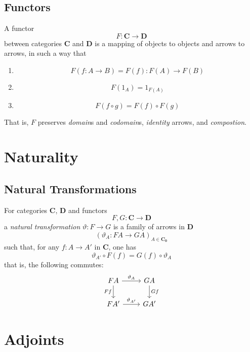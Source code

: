 \documentclass{article}
\begin{document}
\subsection{Functors}
\begin{defn}[{\cite{AS10}}]
A functor
\[
F: \mathbf{C} \rightarrow \mathbf{D}
\]
between categories $\mathbf{C}$ and $\mathbf{D}$ is a mapping of objects to objects and arrows to arrows,
in such a way that
\begin{enumerate}
\item
\[
F(f:A \rightarrow B) = F(f):F(A) \rightarrow F(B)
\]
\item
\[
F(1_{A}) = 1_{F(A)}
\]
\item
\[
F(f \circ g) = F(f) \circ F(g)
\]
\end{enumerate}
That is, $F$ preserves \emph{domain}s and \emph{codomain}s, \emph{identity} arrows, and \emph{compostion}.
\end{defn}

\section{Naturality}
\subsection{Natural Transformations}
\begin{defn}[{\cite{AS10}}]
For categories $\mathbf{C}$, $\mathbf{D}$ and functors
\[
F,G: \mathbf{C} \rightarrow \mathbf{D}
\]
a \emph{natural transformation} $\vartheta: F \rightarrow G$ is a family of arrows in $\mathbf{D}$
\[
(\vartheta_{A}: FA \rightarrow GA)_{A \in \mathbf{C_0}}
\]
such that, for any $f: A \rightarrow A'$ in $\mathbf{C}$, one has
\[
\vartheta_{A'} \circ F(f) = G(f) \circ \vartheta_{A}
\]
that is, the following commutes:
\[
\begin{tikzcd}
FA \arrow[r, "\vartheta_{A}"] \arrow[d, "Ff"'] & GA \arrow[d, "Gf"] \\
FA' \arrow[r, "\vartheta_{A'}"] & GA'
\end{tikzcd}
\]
\end{defn}

\section{Adjoints}
\end{document}
